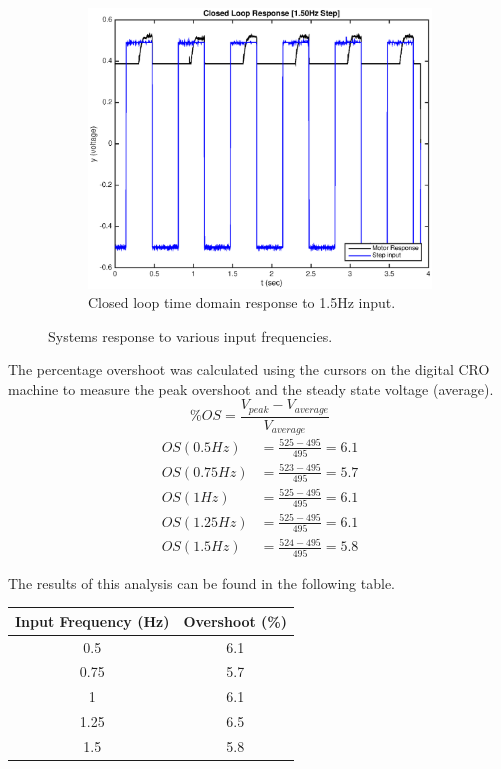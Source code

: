 \documentclass[11pt,a4paper]{article}
\begin{document}
\begin{enumerate}
\begin{figure}[H]
	  \begin{subfigure}{0.5\textwidth}
	  \includegraphics[width=0.9\linewidth]{Matlab_Code/Figures/D2_1_50Hz.eps}
	  \caption{Closed loop time domain response to 1.5Hz input.}
	  \label{fig:subim2}
	  \end{subfigure}
	\caption{\label{fig:freqimpact}Systems response to various input frequencies.}
	\end{figure}
	
	\pagebreak
	The percentage overshoot was calculated using the cursors on the digital CRO machine to measure the peak overshoot and the steady state voltage (average). 
	$$ \%OS = \frac{V_{peak}-V_{average}}{V_{average}} $$
	\begin{align*}
	OS(0.5Hz) 	&= \frac{525-495}{495} = 6.1 	\\
	OS(0.75Hz) 	&= \frac{523-495}{495} = 5.7 	\\
	OS(1Hz) 	&= \frac{525-495}{495} = 6.1 	\\
	OS(1.25Hz) 	&= \frac{525-495}{495} = 6.1 	\\
	OS(1.5Hz) 	&= \frac{524-495}{495} = 5.8 	
	\end{align*}
	
	The results of this analysis can be found in the following table.
	
\begin{center}
    \begin{tabular}{| c | c |}
    \hline
    Input Frequency (Hz)  & Overshoot (\%)  \\ \hline
    0.5  	                  & 6.1  		\\ \hline
	0.75  	                  & 5.7  		\\ \hline
	1		                  & 6.1 		\\ \hline
	1.25	                  & 6.5 		\\ \hline
	1.5		                  & 5.8 		\\
    \hline
    \end{tabular}
\end{center}



\end{enumerate}
\end{document}
